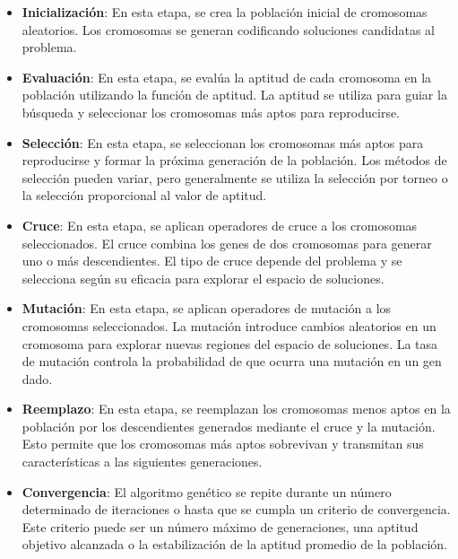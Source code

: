 \begin{itemize}

\item \textbf{Inicialización}: En esta etapa, se crea la población inicial de cromosomas aleatorios. Los cromosomas se generan codificando soluciones candidatas al problema.

\item \textbf{Evaluación}: En esta etapa, se evalúa la aptitud de cada cromosoma en la población utilizando la función de aptitud. La aptitud se utiliza para guiar la búsqueda y seleccionar los cromosomas más aptos para reproducirse.

\item \textbf{Selección}: En esta etapa, se seleccionan los cromosomas más aptos para reproducirse y formar la próxima generación de la población. Los métodos de selección pueden variar, pero generalmente se utiliza la selección por torneo o la selección proporcional al valor de aptitud.

\item \textbf{Cruce}: En esta etapa, se aplican operadores de cruce a los cromosomas seleccionados. El cruce combina los genes de dos cromosomas para generar uno o más descendientes. El tipo de cruce depende del problema y se selecciona según su eficacia para explorar el espacio de soluciones.

\item \textbf{Mutación}: En esta etapa, se aplican operadores de mutación a los cromosomas seleccionados. La mutación introduce cambios aleatorios en un cromosoma para explorar nuevas regiones del espacio de soluciones. La tasa de mutación controla la probabilidad de que ocurra una mutación en un gen dado.

\item \textbf{Reemplazo}: En esta etapa, se reemplazan los cromosomas menos aptos en la población por los descendientes generados mediante el cruce y la mutación. Esto permite que los cromosomas más aptos sobrevivan y transmitan sus características a las siguientes generaciones.

\item \textbf{Convergencia}: El algoritmo genético se repite durante un número determinado de iteraciones o hasta que se cumpla un criterio de convergencia. Este criterio puede ser un número máximo de generaciones, una aptitud objetivo alcanzada o la estabilización de la aptitud promedio de la población.
\end{itemize}


